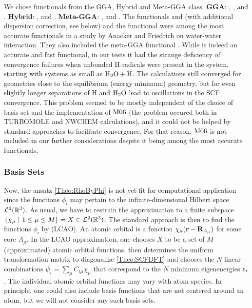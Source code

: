 \documentclass[8.5pt,twoside,twocolumn]{article}
\renewcommand\r{\bo r}
\theoremstyle{standard}
\begin{document}
We chose functionals from the GGA, Hybrid and Meta-GGA class.\newline
\textbf{GGA}: \bp, \blyp, {\pbe} and \bns\cite{GrimmeB97-D2006}.\newline
\textbf{Hybrid}: \btlyp, {\bhlyp} and \pbez. \newline
\textbf{Meta-GGA}: \tpss, {\tpssh} and \pw. \newline
The functionals {\bns} and \pw (with additional dispersion correction, see below) and the
{\pbez} functional were among the most accurate functionals in a study by Anacker and Friedrich
\cite{Anacker2014} on water-water interaction. They also included the meta-GGA functional \mos. While
{\mos} is indeed an accurate and fast functional, in our tests it had the strange deficiency of
convergence failures when unbonded H-radicals were present in the system, starting with systems
as small as $\text H _2 \text O + \text H$. The calculations still converged for geometries close to the
equilibrium (energy minimum) geometry, but for even slightly longer separations of H and $\text H _2 \text O$
lead to oscillations in the SCF convergence. This problem seemed to be mostly independent
of the choice of basis set and the implementation of $\text{M06}$ (the problem occured both
in TURBOMOLE and NWCHEM calculations), and it could not be helped by standard approaches
to facilitate convergence. For that reason, $\text{M06}$ is not included
in our further considerations despite it being among the most accurate functionals.

\subsubsection{Basis Sets}
\label{Sec:Theo:Basis}
Now, the ansatz \eqref{Theo:RhoByPhi} is not yet fit for computational application since the
functions $\phi_i$ may pertain to the infinite-dimensional Hilbert space $\mathcal L^2(\mathbb{R}^3)$.
As usual, we have to restrain the approximation to a finite subspace $\left\{{\chi_\mu\ |\ 1 \le \mu \le M} \right\} = X \subset \mathcal L^2(\mathbb{R}^3)$.
The standard approach is then to find the functions $\phi_i$ by  (LCAO). An atomic orbital is a function $\chi_\mu(\r - \bo R_{A_\mu})$
for some core $A_\mu$. In the LCAO approximation, one chooses $X$ to be a set of $M$ (approximated) atomic orbital
functions, then determines the uniform transformation matrix to diagonalize \eqref{Theo:SCFDFT}
and chooses the $N$ linear combinations $\psi_i=\sum_\mu C_{i \mu} \chi_\mu$ that correspond to the $N$ minimum
eigenenergies $\epsilon_i$. The individual atomic orbital functions may vary with atom species. In principle,
one could also include basis functions that are not centered around an atom, but we will
not consider any such basis sets.
\end{document}
